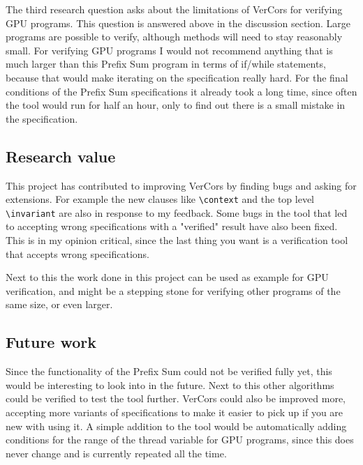 \documentclass[a4paper]{article}
\newcommand{\code}[1]{\texttt{\small \color{inline}#1}} %
\begin{document}
The third research question asks about the limitations of VerCors for verifying GPU programs. This question is answered above in the discussion section. Large programs are possible to verify, although methods will need to stay reasonably small. For verifying GPU programs I would not recommend anything that is much larger than this Prefix Sum program in terms of if/while statements, because that would make iterating on the specification really hard. For the final conditions of the Prefix Sum specifications it already took a long time, since often the tool would run for half an hour, only to find out there is a small mistake in the specification.

\subsection{Research value}
This project has contributed to improving VerCors by finding bugs and asking for extensions. For example the new clauses like \code{\textbackslash context} and the top level \code{\textbackslash invariant} are also in response to my feedback. Some bugs in the tool that led to accepting wrong specifications with a "verified" result have also been fixed. This is in my opinion critical, since the last thing you want is a verification tool that accepts wrong specifications.

Next to this the work done in this project can be used as example for GPU verification, and might be a stepping stone for verifying other programs of the same size, or even larger.

\subsection{Future work}
Since the functionality of the Prefix Sum could not be verified fully yet, this would be interesting to look into in the future. Next to this other algorithms could be verified to test the tool further. VerCors could also be improved more, accepting more variants of specifications to make it easier to pick up if you are new with using it. A simple addition to the tool would be automatically adding conditions for the range of the thread variable for GPU programs, since this does never change and is currently repeated all the time.
\end{document}
